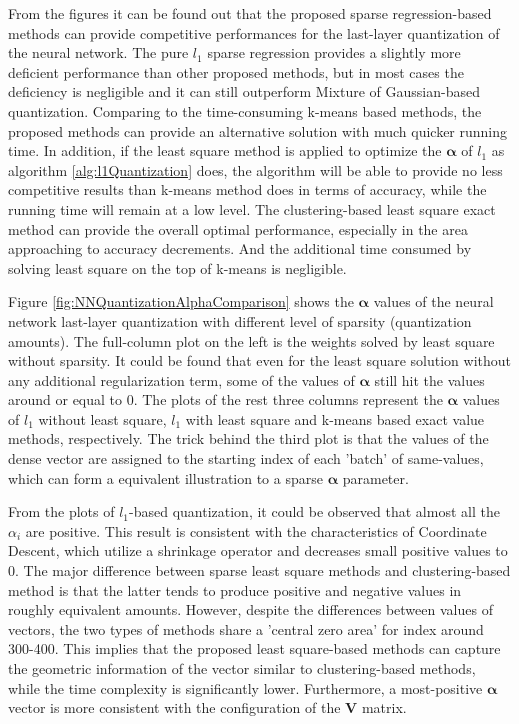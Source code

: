 \documentclass[preprint,10pt]{elsarticle}
\begin{document}
From the figures it can be found out that the proposed sparse regression-based methods can provide competitive performances for the last-layer quantization of the neural network. The pure $l_1$ sparse regression provides a slightly more deficient performance than other proposed methods, but in most cases the deficiency is negligible and it can still outperform Mixture of Gaussian-based quantization. Comparing to the time-consuming k-means based methods, the proposed methods can provide an alternative solution with much quicker running time. In addition, if the least square method is applied to optimize the $\boldsymbol{\alpha}$ of $l_1$ as algorithm \ref{alg:l1Quantization} does, the algorithm will be able to provide no less competitive results than k-means method does in terms of accuracy, while the running time will remain at a low level. The clustering-based least square exact method can provide the overall optimal performance, especially in the area approaching to accuracy decrements. And the additional time consumed by solving least square on the top of k-means is negligible. \par
Figure \ref{fig:NNQuantizationAlphaComparison} shows the $\boldsymbol{\alpha}$ values of the neural network last-layer quantization with different level of sparsity (quantization amounts). The full-column plot on the left is the weights solved by least square without sparsity. It could be found that even for the least square solution without any additional regularization term, some of the values of $\boldsymbol{\alpha}$ still hit the values around or equal to 0. The plots of the rest three columns represent the $\boldsymbol{\alpha}$ values of $l_1$ without least square, $l_1$ with least square and k-means based exact value methods, respectively. The trick behind the third plot is that the values of the dense vector are assigned to the starting index of each 'batch' of same-values, which can form a equivalent illustration to a sparse $\boldsymbol{\alpha}$ parameter. \par
From the plots of $l_1$-based quantization, it could be observed that almost all the $\alpha_{i}$ are positive. This result is consistent with the characteristics of Coordinate Descent, which utilize a shrinkage operator and decreases small positive values to $0$. The major difference between sparse least square methods and clustering-based method is that the latter tends to produce positive and negative values in roughly equivalent amounts. However, despite the differences between values of vectors, the two types of methods share a 'central zero area' for index around 300-400. This implies that the proposed least square-based methods can capture the geometric information of the vector similar to clustering-based methods, while the time complexity is significantly lower. Furthermore, a most-positive $\boldsymbol{\alpha}$ vector is more consistent with the configuration of the $\boldsymbol{V}$ matrix. \par
\end{document}
